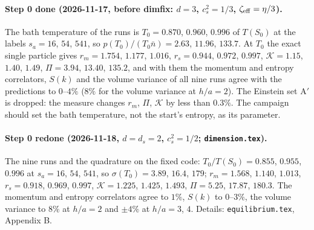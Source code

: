 \documentclass[11pt,aps,preprint,nofootinbib,superscriptaddress,tightenlines]{revtex4-2}
\let\oldparagraph\paragraph
\renewcommand{\paragraph}{\par\bigskip\oldparagraph}
\begin{document}
\paragraph{Step 0 done (2026-11-17, before dimfix: $d=3$, $c_s^2=1/3$, $\zeta_{\rm eff}=\eta/3$).}  The bath temperature of the runs is $T_0=0.870$, $0.960$, $0.996$ of $T(S_0)$ at the labels $s_a=16$, $54$, $541$, so
$p(T_0)/(T_0\bar n)=2.63$, $11.96$, $133.7$.  At $T_0$ the exact single particle gives $r_m=1.754$, $1.177$, $1.016$, $r_s=0.944$, $0.972$, $0.997$, $\mathcal K=1.15$, $1.40$, $1.49$,
$\Pi=3.94$, $13.40$, $135.2$, and
with them the momentum and entropy correlators, $S(k)$ and the volume variance of all nine runs agree with the predictions to $0$--$4\%$ ($8\%$ for the
volume variance at $h/a=2$).  The Einstein set A$'$ is dropped: the measure changes
$r_m$, $\Pi$, $\mathcal K$ by less than $0.3\%$.  The campaign should set the bath temperature, not the start's entropy, as its parameter.

\paragraph{Step 0 redone (2026-11-18, $d=d_s=2$, $c_s^2=1/2$; \texttt{dimension.tex}).}  The nine runs and the quadrature on the fixed code: $T_0/T(S_0)=0.855$,
$0.955$, $0.996$ at $s_a=16$, $54$, $541$, so $\sigma(T_0)=3.89$, $16.4$, $179$; $r_m=1.568$, $1.140$, $1.013$, $r_s=0.918$, $0.969$, $0.997$, $\mathcal K=1.225$,
$1.425$, $1.493$, $\Pi=5.25$, $17.87$, $180.3$.  The momentum and entropy correlators agree to $1\%$, $S(k)$ to $0$--$3\%$, the volume variance to
$8\%$ at $h/a=2$ and $\pm4\%$ at $h/a=3$, $4$.  Details: \texttt{equilibrium.tex}, Appendix B.
\end{document}
